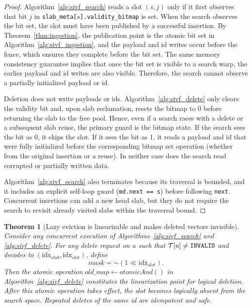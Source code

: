 \documentclass[sigconf,nonacm]{acmart}
\theoremstyle{plain}
\newtheorem{theorem}{Theorem}[section]
\theoremstyle{definition}
\theoremstyle{remark}
\begin{document}
\begin{proof}
Algorithm~\ref{alg:sivf_search} reads a slot $(s,j)$ only if it first observes that bit $j$ in
\texttt{slab\_meta[$s$].validity\_bitmap} is set. When the search observes the bit set, the slot must have been published
by a successful insertion. By Theorem~\ref{thm:ingestion}, the publication point is the atomic bit set in
Algorithm~\ref{alg:sivf_ingestion}, and the payload and id writes occur before the fence, which ensures they complete before the bit set.
The same memory consistency guarantee implies that once the bit set is visible to a search warp, the earlier payload and
id writes are also visible. Therefore, the search cannot observe a partially initialized payload or id.

Deletion does not write payloads or ids. Algorithm~\ref{alg:sivf_delete} only clears the validity bit and, upon slab reclamation, 
resets the bitmap to 0 before returning the slab to the free pool. 
Hence, even if a search races with a delete or a subsequent slab reuse, the primary guard is the bitmap state.
If the search sees the bit as 0, it skips the slot. If it sees the bit as 1, it reads a payload and id that were fully initialized
before the corresponding bitmap set operation (whether from the original insertion or a reuse). 
In neither case does the search read corrupted or partially written data.

Algorithm~\ref{alg:sivf_search} also terminates because its traversal is bounded, and it includes an explicit self-loop guard
(\texttt{md.next == s}) before following \texttt{next}. Concurrent insertions can add a new head slab, but they do not require the
search to revisit already visited slabs within the traversal bound.
\end{proof}

\begin{theorem}[Lazy eviction is linearizable and makes deleted vectors invisible]
\label{thm:delete}
Consider any concurrent execution of Algorithms~\ref{alg:sivf_search} and \ref{alg:sivf_delete}.
For any delete request on $u$ such that 
$\mathcal{T}[u] \neq \textnormal{\texttt{INVALID}}$
and decodes to
$(\text{idx}_{slab},\text{idx}_{slot})$, define
\[
mask = \mathbin{\sim}(1 \ll \text{idx}_{slot}).
\]
Then the atomic operation
$old\_map \gets atomicAnd()$ 
in Algorithm~\ref{alg:sivf_delete} constitutes the linearization point for logical deletion. After this atomic operation takes effect,
the slot becomes logically absent from the search space. Repeated deletes of the same id are idempotent and safe.
\end{theorem}
\end{document}
